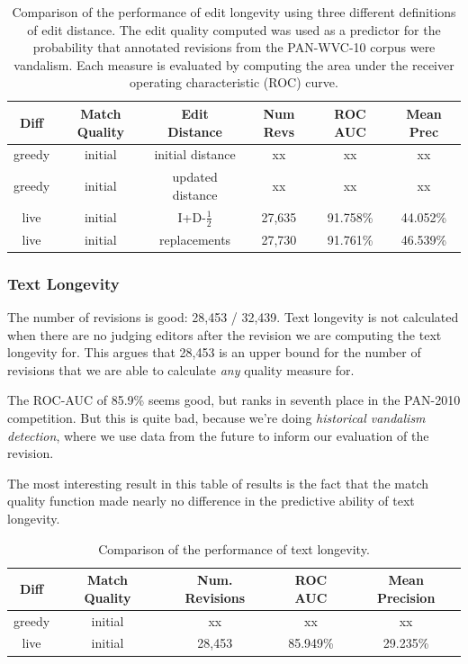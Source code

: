 \begin{table}[tbph]
\begin{center}
\begin{tabular}{|c|c|c||c|c|c|}
\hline
Diff & Match Quality & Edit Distance & Num Revs & ROC AUC & Mean Prec \\
\hline
\hline
greedy & initial &initial distance & xx & xx & xx \\
greedy & initial &updated distance & xx & xx & xx \\
live & initial &I+D-$\frac{1}{2}$ & 27,635 & 91.758\% & 44.052\% \\
live & initial &replacements & 27,730 & 91.761\% & 46.539\% \\
\hline
\end{tabular}
\end{center}
\caption{Comparison of the performance of edit longevity
  using three different definitions of edit distance.
  The edit quality computed was used as a predictor for the probability
  that annotated revisions from the PAN-WVC-10 corpus were vandalism.
  Each measure is evaluated by computing the area under the
  receiver operating characteristic (ROC) curve.
} 
\end{table}


\subsubsection{Text Longevity}

The number of revisions is good: 28,453 / 32,439.
Text longevity is not calculated when there are no
judging editors after the revision we are computing
the text longevity for.
This argues that 28,453 is an upper bound for the number
of revisions that we are able to calculate \textit{any}
quality measure for.

The ROC-AUC of 85.9\% seems good, but ranks in seventh place
in the PAN-2010 competition.
But this is quite bad, because we're doing \textit{historical
vandalism detection}, where we use data from the future to
inform our evaluation of the revision.

The most interesting result in this table of results
is the fact that the match quality function made
nearly no difference in the predictive ability of
text longevity.


\begin{table}[tbph]
\begin{center}
\begin{tabular}{|c|c||c|c|c|}
\hline
Diff & Match Quality & Num. Revisions & ROC AUC & Mean Precision \\
\hline
\hline
greedy & initial & xx & xx & xx \\
live & initial & 28,453 & 85.949\% & 29.235\% \\
\hline
\end{tabular}
\end{center}
\caption{Comparison of the performance of text longevity.
} 
\end{table}

